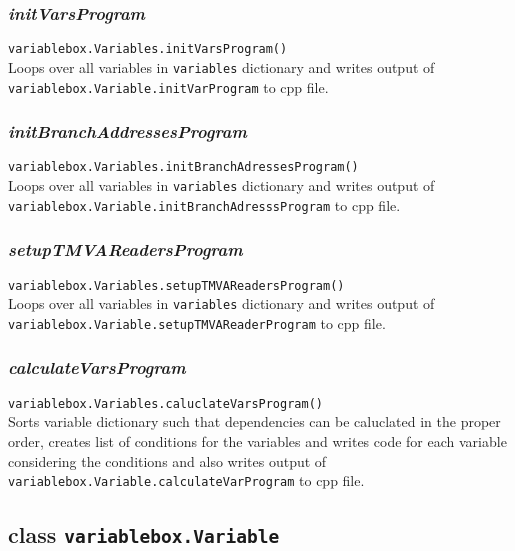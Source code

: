 \documentclass[12pt, a4paper]{article}
\begin{document}
\subsubsection{\textit{initVarsProgram}}
\texttt{variablebox.Variables.initVarsProgram()}\\
Loops over all variables in \texttt{variables} dictionary and writes output of \texttt{variablebox.Variable.initVarProgram} to cpp file.

\subsubsection{\textit{initBranchAddressesProgram}}
\texttt{variablebox.Variables.initBranchAdressesProgram()}\\
Loops over all variables in \texttt{variables} dictionary and writes output of \texttt{variablebox.Variable.initBranchAdresssProgram} to cpp file.

\subsubsection{\textit{setupTMVAReadersProgram}}
\texttt{variablebox.Variables.setupTMVAReadersProgram()}\\
Loops over all variables in \texttt{variables} dictionary and writes output of \texttt{variablebox.Variable.setupTMVAReaderProgram} to cpp file.

\subsubsection{\textit{calculateVarsProgram}}
\texttt{variablebox.Variables.caluclateVarsProgram()}\\
Sorts variable dictionary such that dependencies can be caluclated in the proper order, creates list of conditions for the variables and writes code for each variable considering the conditions and also writes output of \texttt{variablebox.Variable.calculateVarProgram} to cpp file.



\subsection{class \texttt{variablebox.Variable}}
\label{varbox-var}
\end{document}
